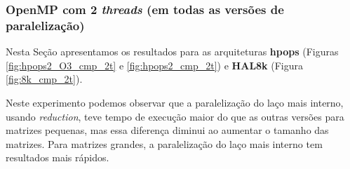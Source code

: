 \documentclass[a4paper, 12pt]{article}
\begin{document}
\subsubsection{OpenMP com 2 \textit{threads} (em todas as versões de paralelização)}

Nesta Seção apresentamos os resultados para as arquiteturas \textbf{hpops}
(Figuras \ref{fig:hpops2_O3_cmp_2t} e \ref{fig:hpops2_cmp_2t}) e \textbf{HAL8k}
(Figura \ref{fig:8k_cmp_2t}).

Neste experimento podemos observar que a paralelização do laço mais
interno, usando \textit{reduction}, teve tempo de execução maior
do que as outras versões para matrizes pequenas, mas essa diferença
diminui ao aumentar o tamanho das matrizes. Para matrizes grandes,
a paralelização do laço mais interno tem resultados mais rápidos.
\end{document}
